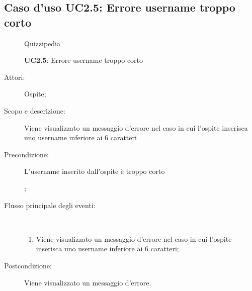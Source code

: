 \subsection{Caso d'uso UC2.5: Errore username troppo corto}
	\begin{figure}[H]
		\centering
		\begin{resizedtikzpicture}{\textwidth}
		\begin{umlsystem}[x=0, fill=lightgray!20]{Quizzipedia}
		\end{umlsystem}
		\end{resizedtikzpicture}
		\caption{\textbf{UC2.5}: Errore username troppo corto}
		\label{UC2.5}
	\end{figure}
\begin{description}
\item[Attori:] Ospite;
\item[Scopo e descrizione:] Viene visualizzato un messaggio d'errore nel caso in cui l'ospite inserisca uno username inferiore ai 6 caratteri
      \item[Precondizione:] L'username inserito dall'ospite è troppo corto

;

        \item[Flusso principale degli eventi:] \ 
 \begin{enumerate}
          \item Viene visualizzato un messaggio d'errore nel caso in cui l'ospite inserisca uno username inferiore ai 6 caratteri;

      \end{enumerate}
    \item[Postcondizione:] Viene visualizzato un messaggio d'errore.
  \end{description}
\hypertarget{UC2.6}{}
